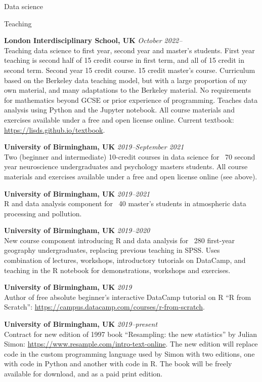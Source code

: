 \documentclass{cv}
\newcommand{\PlaceDateNote}[3]{{\bf #1} \hfill {\em #2} \\#3}
\newcommand{\LIS}{London Interdisciplinary School, UK}
\newcommand{\UoB}{University of Birmingham, UK}
\begin{document}
\begin{cvSection}{Data science}

\begin{cvSubSection}{Teaching}

\PlaceDateNote{\LIS}{October 2022--}
    {Teaching data science to  first year, second year and master's students.
    First year teaching is second half of 15 credit course in first term, and
    all of 15 credit in second term. Second year 15 credit course.  15 credit
    master's course. Curriculum based on the Berkeley data teaching model, but
    with a large proportion of my own material, and many adaptations to the
    Berkeley material.  No requirements for mathematics beyond GCSE or prior
    experience of programming.  Teaches data analysis using Python and the
    Jupyter notebook.  All course materials and exercises available under a
    free and open license online.  Current textbook:
    \url{https://lisds.github.io/textbook}.}

\PlaceDateNote{\UoB}{2019--September 2021}
    {Two (beginner and intermediate) 10-credit courses in data science for
    ~70 second year neuroscience undergraduates and psychology masters
    students. All course materials and exercises available under a free and
    open license online (see above).}

\PlaceDateNote{\UoB}{2019--2021}
    {R and data analysis component for ~40 master's students in atmospheric
    data processing and pollution}.

\PlaceDateNote{\UoB}{2019--2020}
    {New course component introducing R and
    data analysis for ~280 first-year geography undergraduates, replacing
    previous teaching in SPSS. Uses combination of lectures, workshops,
    introductory tutorials on DataCamp, and teaching in the R notebook for
    demonstrations, workshops and exercises.}

\PlaceDateNote{\UoB}{2019}
    {Author of free absolute beginner's interactive DataCamp tutorial on R ``R
    from Scratch'': \url{https://campus.datacamp.com/courses/r-from-scratch}.}

\PlaceDateNote{\UoB}{2019--present}
    {Contract for new edition of 1997 book ``Resampling: the new statistics''
    by Julian Simon: \url{https://www.resample.com/intro-text-online}.  The new
    edition will replace code in the custom programming language used by Simon
    with two editions, one with code in Python and another with code in R.  The
    book will be freely available for download, and as a paid print edition}.


\end{cvSubSection}
\end{cvSection}
\end{document}
